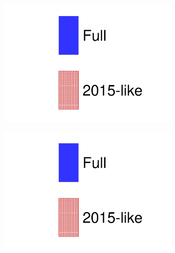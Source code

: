 \begin{figure}[h]
	\begin{subfigure}[t]{0.32\textwidth}
		\includegraphics[width=\textwidth, trim={0mm 0mm 0mm 0mm}, clip, page=4]{figures/mach3/data/alt/try_2017_fit_on_sk_spectra_posterior_sk_error_2015like_spectra}
	\end{subfigure}
	\begin{subfigure}[t]{0.32\textwidth}
		\includegraphics[width=\textwidth, trim={0mm 0mm 0mm 0mm}, clip, page=5]{figures/mach3/data/alt/try_2017_fit_on_sk_spectra_posterior_sk_error_2015like_spectra}
	\end{subfigure}
	\begin{subfigure}[t]{0.32\textwidth}

\end{subfigure}
\end{figure}
